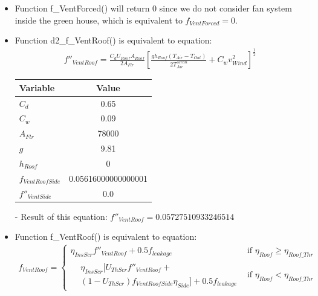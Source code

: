 \documentclass[a4paper]{article}
\begin{document}
\begin{itemize}
  \item Function f\_VentForced() will return \(0\) since we do not consider fan system inside the green house, which is equivalent to \(f_{VentForced} = 0\).

  \item Function d2\_f\_VentRoof() is equivalent to equation:
        \begin{align*}
          f''_{VentRoof} = \frac{C_d U_{Roof} A_{Roof}}{2A_{Flr}} {\left[\frac{gh_{Roof}(T_{Air} - T_{Out})}{2T^{Mean}_{Air}} + C_w v^2_{Wind}\right]}^{ \frac{1}{2}}
        \end{align*}

        \begin{table}[H]
          \centering
          \begin{tabular}{@{}lS[table-format=5.17]@{}}
            \toprule
            \textbf{Variable}    & \textbf{Value}      \\
            \midrule
            \(C_d\)              & 0.65                \\
            \(C_w\)              & 0.09                \\
            \(A_{Flr}\)          & 78000               \\
            \(g\)                & 9.81                \\
            \(h_{Roof}\)         & 0                   \\
            \(f_{VentRoofSide}\) & 0.05616000000000001 \\
            \(f''_{VentSide}\)   & 0.0                 \\
            \bottomrule
          \end{tabular}
        \end{table}

  \item[-] Result of this equation: \(f''_{VentRoof} = 0.05727510933246514\)

  \item Function f\_VentRoof() is equivalent to equation:
        \begin{gather*}
          f_{VentRoof} =
          \begin{cases}
            \eta_{InsScr} f''_{VentRoof} + 0.5f_{leakage} & \text{if~} \eta_{Roof} \geq \eta_{Roof\_Thr} \\
            \begin{split}
              & \eta_{InsScr} [U_{ThScr}f''_{VentRoof} + \\
              & (1-U_{ThScr})f_{VentRoofSide} \eta_{Side}] + 0.5 f_{leakage}
            \end{split}                   & \text{if~}  \eta_{Roof} < \eta_{Roof\_Thr}
          \end{cases}
        \end{gather*}


\end{itemize}
\end{document}
